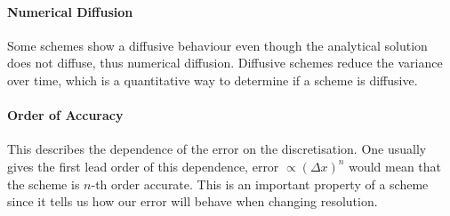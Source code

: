 \paragraph{Numerical Diffusion}
Some schemes show a diffusive behaviour even though the analytical solution does not diffuse, thus numerical diffusion. Diffusive schemes reduce the variance over time, which is a quantitative way to determine if a scheme is diffusive.  
\paragraph{Order of Accuracy}
This describes the dependence of the error on the discretisation. One usually gives the first lead order of this dependence,  error $\propto (\Delta x)^n$ would mean that the scheme is $n$-th order accurate. This is an important property of a scheme since it tells us how our error will behave when changing resolution.
